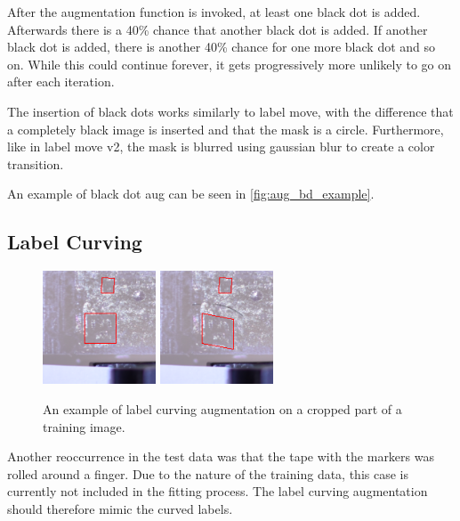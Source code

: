 \documentclass[10pt]{book}
\newcommand{\figureref}[1]{\autoref{#1}}
\begin{document}
After the augmentation function is invoked, at least one black dot is added. Afterwards there is a 40\% chance that another black dot is added. If another black dot is added, there is another 40\% chance for one more black dot and so on. While this could continue forever, it gets progressively more unlikely to go on after each iteration. 

The insertion of black dots works similarly to label move, with the difference that a completely black image is inserted and that the mask is a circle. Furthermore, like in label move v2, the mask is blurred using gaussian blur to create a color transition.

An example of black dot aug can be seen in \figureref{fig:aug_bd_example}.

\subsection{Label Curving}
\label{sec:label_curving}

\begin{figure}
  \centering
     {\includegraphics[width=0.3\textwidth]{image/aug_lc_before}}
     {\includegraphics[width=0.3\textwidth]{image/aug_lc_after}}
  \caption{An example of label curving augmentation on a cropped part of a training image.}
  \label{fig:aug_lc_example}
\end{figure}

Another reoccurrence in the test data was that the tape with the markers was rolled around a finger. Due to the nature of the training data, this case is currently not included in the fitting process. The label curving augmentation should therefore mimic the curved labels.
\end{document}
